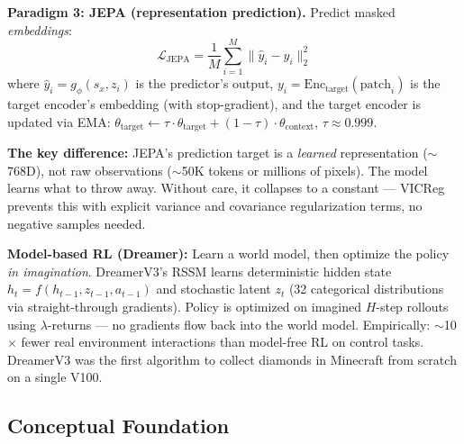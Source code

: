 \textbf{Paradigm 3: JEPA (representation prediction).} Predict masked \textit{embeddings}:
$$\mathcal{L}_{\text{JEPA}} = \frac{1}{M}\sum_{i=1}^{M}\|\hat{y}_i - y_i\|_2^2$$
where $\hat{y}_i = g_\phi(s_x, z_i)$ is the predictor's output, $y_i = \text{Enc}_{\text{target}}(\text{patch}_i)$ is the target encoder's embedding (with stop-gradient), and the target encoder is updated via EMA: $\theta_{\text{target}} \leftarrow \tau \cdot \theta_{\text{target}} + (1 - \tau)\cdot\theta_{\text{context}}$, $\tau \approx 0.999$.

\textbf{The key difference:} JEPA's prediction target is a \textit{learned} representation ($\sim$768D), not raw observations ($\sim$50K tokens or millions of pixels). The model learns what to throw away. Without care, it collapses to a constant --- VICReg prevents this with explicit variance and covariance regularization terms, no negative samples needed.

\textbf{Model-based RL (Dreamer):} Learn a world model, then optimize the policy \textit{in imagination}. DreamerV3's RSSM learns deterministic hidden state $h_t = f(h_{t-1}, z_{t-1}, a_{t-1})$ and stochastic latent $z_t$ (32 categorical distributions via straight-through gradients). Policy is optimized on imagined $H$-step rollouts using $\lambda$-returns --- no gradients flow back into the world model. Empirically: $\sim$10$\times$ fewer real environment interactions than model-free RL on control tasks. DreamerV3 was the first algorithm to collect diamonds in Minecraft from scratch on a single V100.

\subsection*{Conceptual Foundation}


